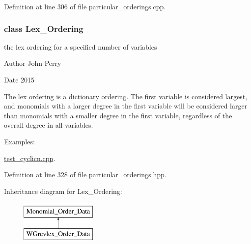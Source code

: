 Definition at line 306 of file particular\+\_\+orderings.\+cpp.

\label{class_lex___ordering}
\subsubsection{class Lex\+\_\+\+Ordering}
the lex ordering for a specified number of variables 

\begin{DoxyAuthor}{Author}
John Perry 
\end{DoxyAuthor}
\begin{DoxyDate}{Date}
2015
\end{DoxyDate}
The lex ordering is a dictionary ordering. The first variable is considered largest, and monomials with a larger degree in the first variable will be considered larger than monomials with a smaller degree in the first variable, regardless of the overall degree in all variables. \begin{Desc}
\item[Examples\+: ]\par
\hyperlink{test_cyclicn_8cpp-example}{test\+\_\+cyclicn.\+cpp}.\end{Desc}


Definition at line 328 of file particular\+\_\+orderings.\+hpp.

Inheritance diagram for Lex\+\_\+\+Ordering\+:\begin{figure}[H]
\begin{center}
\leavevmode
\includegraphics[height=2.000000cm]{group__orderinggroup}
\end{center}
\end{figure}
